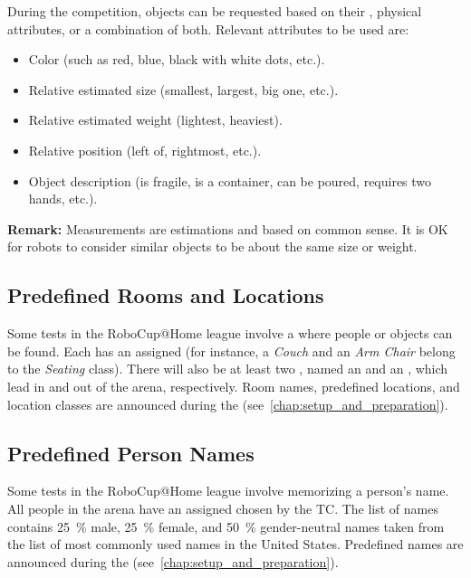During the competition, objects can be requested based on their \ObjectCategory, physical attributes, or a combination of both.
Relevant attributes to be used are:
\begin{itemize}
	\item Color (such as red, blue, black with white dots, etc.).
	\item Relative estimated size (smallest, largest, big one, etc.).
	\item Relative estimated weight (lightest, heaviest).
	\item Relative position (left of, rightmost, etc.).
	\item Object description (is fragile, is a container, can be poured, requires two hands, etc.).
\end{itemize}

\noindent\textbf{Remark:} Measurements are estimations and based on common sense. It is OK for robots to consider similar objects to be about the same size or weight.

%
%

\subsection{Predefined Rooms and Locations}
\label{rule:scenario_locations}

Some tests in the RoboCup@Home league involve a \PredefinedLocation{} where people or objects can be found.
Each \PredefinedLocation{} has an assigned \LocationClass{} (for instance, a \textit{Couch} and an \textit{Arm Chair} belong to the \textit{Seating} class).
There will also be at least two , named an \Entrance{} and an \Exit, which lead in and out of the arena, respectively.
Room names, predefined locations, and location classes are announced during the \SetupDays{} (see~\ref{chap:setup_and_preparation}).

\subsection{Predefined Person Names}
\label{rule:scenario_names}

Some tests in the RoboCup@Home league involve memorizing a person's name.
All people in the arena have an assigned \PredefinedName{} chosen by the TC.
The list of names contains \SI{25}{\percent} male, \SI{25}{\percent} female, and \SI{50}{\percent} gender-neutral names taken from the list of most commonly used names in the United States.
Predefined names are announced during the \SetupDays{} (see~\ref{chap:setup_and_preparation}).

